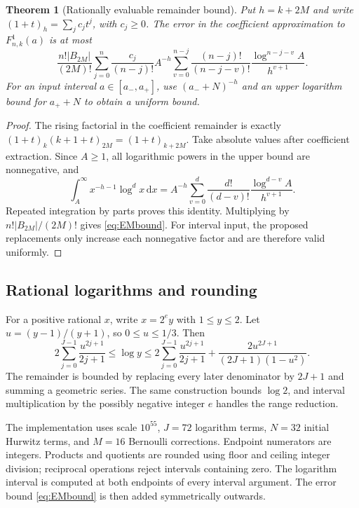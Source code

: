 \documentclass[11pt]{article}
\numberwithin{equation}{section}
\newtheorem{theorem}{Theorem}[section]
\theoremstyle{definition}\newtheorem{definition}[theorem]{Definition}
\theoremstyle{remark}\newtheorem{remark}[theorem]{Remark}
\newcommand{\dd}{\,\mathrm d}
\begin{document}
\begin{theorem}[Rationally evaluable remainder bound]\label{thm:EMbound}
Put $h=k+2M$ and write $(1+t)_h=\sum_j c_jt^j$, with $c_j\geq0$. The error in the coefficient approximation to $F_{n,k}^{1}(a)$ is at most
\begin{equation}\label{eq:EMbound}
\boxed{\frac{n!|B_{2M}|}{(2M)!}
\sum_{j=0}^{n}\frac{c_j}{(n-j)!}A^{-h}
\sum_{v=0}^{n-j}\frac{(n-j)!}{(n-j-v)!}\frac{\log^{n-j-v}A}{h^{v+1}}.}
\end{equation}
For an input interval $a\in[a_-,a_+]$, use $(a_-+N)^{-h}$ and an upper logarithm bound for $a_++N$ to obtain a uniform bound.
\end{theorem}
\begin{proof}
The rising factorial in the coefficient remainder is exactly
$(1+t)_k(k+1+t)_{2M}=(1+t)_{k+2M}$. Take absolute values after coefficient extraction. Since $A\geq1$, all logarithmic powers in the upper bound are nonnegative, and
\[
\int_A^\infty x^{-h-1}\log^d x\dd x
=A^{-h}\sum_{v=0}^d\frac{d!}{(d-v)!}\frac{\log^{d-v}A}{h^{v+1}}.
\]
Repeated integration by parts proves this identity. Multiplying by $n!|B_{2M}|/(2M)!$ gives \eqref{eq:EMbound}. For interval input, the proposed replacements only increase each nonnegative factor and are therefore valid uniformly.
\end{proof}

\subsection{Rational logarithms and rounding}
For a positive rational $x$, write $x=2^e y$ with $1\leq y\leq2$. Let $u=(y-1)/(y+1)$, so $0\leq u\leq1/3$. Then
\begin{equation}\label{eq:logbound}
2\sum_{j=0}^{J-1}\frac{u^{2j+1}}{2j+1}
\leq\log y\leq
2\sum_{j=0}^{J-1}\frac{u^{2j+1}}{2j+1}
+\frac{2u^{2J+1}}{(2J+1)(1-u^2)}.
\end{equation}
The remainder is bounded by replacing every later denominator by $2J+1$ and summing a geometric series. The same construction bounds $\log2$, and interval multiplication by the possibly negative integer $e$ handles the range reduction.

The implementation uses scale $10^{55}$, $J=72$ logarithm terms, $N=32$ initial Hurwitz terms, and $M=16$ Bernoulli corrections. Endpoint numerators are integers. Products and quotients are rounded using floor and ceiling integer division; reciprocal operations reject intervals containing zero. The logarithm interval is computed at both endpoints of every interval argument. The error bound \eqref{eq:EMbound} is then added symmetrically outwards.
\end{document}
